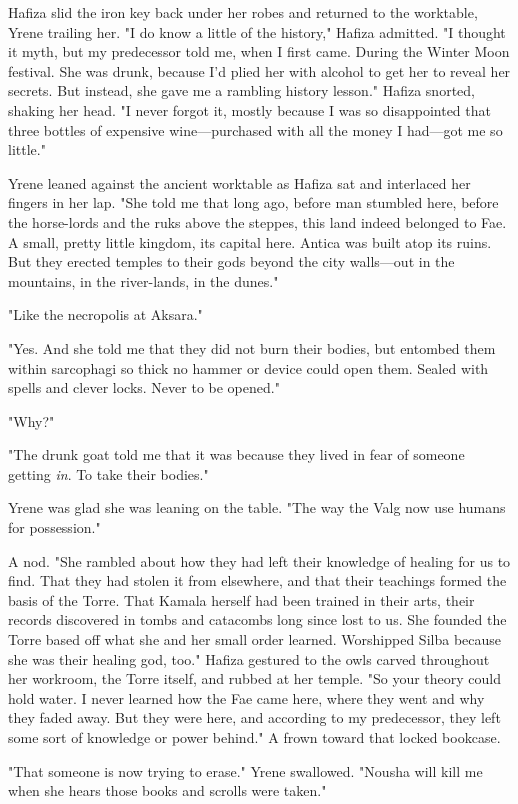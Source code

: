 Hafiza slid the iron key back under her robes and returned to the worktable, Yrene trailing her. "I do know a little of the history," Hafiza admitted. "I thought it myth, but  my predecessor told me, when I first came. During the Winter Moon festival. She was drunk, because I'd plied her with alcohol to get her to reveal her secrets. But instead, she gave me a rambling history lesson." Hafiza snorted, shaking her head. "I never forgot it, mostly because I was so disappointed that three bottles of expensive wine---purchased with all the money I had---got me so little."

Yrene leaned against the ancient worktable as Hafiza sat and interlaced her fingers in her lap. "She told me that long ago, before man stumbled here, before the horse-lords and the ruks above the steppes, this land indeed belonged to Fae. A small, pretty little kingdom, its capital here. Antica was built atop its ruins. But they erected temples to their gods beyond the city walls---out in the mountains, in the river-lands, in the dunes."

"Like the necropolis at Aksara."

"Yes. And she told me that they did not burn their bodies, but entombed them within sarcophagi so thick no hammer or device could open them. Sealed with spells and clever locks. Never to be opened."

"Why?"

"The drunk goat told me that it was because they lived in fear of someone getting \emph{in}. To take their bodies."

Yrene was glad she was leaning on the table. "The way the Valg now use humans for possession."

A nod. "She rambled about how they had left their knowledge of healing for us to find. That they had stolen it from elsewhere, and that their teachings formed the basis of the Torre. That Kamala herself had been trained in their arts, their records discovered in tombs and catacombs long since lost to us. She founded the Torre based off what she and her small order learned. Worshipped Silba because she was their healing god, too." Hafiza gestured to the owls carved throughout her workroom, the Torre itself, and rubbed at her temple. "So your theory could hold water. I never learned how the Fae came here, where they went and why they faded away. But they were here, and according to my predecessor, they left some sort of knowledge or power behind." A frown toward that locked bookcase.

"That someone is now trying to erase." Yrene swallowed. "Nousha will kill me when she hears those books and scrolls were taken."

